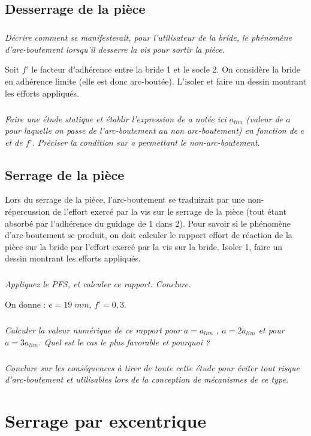\documentclass[10pt]{article}
\begin{document}
\subsection*{Desserrage de la pièce}

\subparagraph{}
\textit{Décrire comment se manifesterait, pour l’utilisateur de la bride, le phénomène d’arc-boutement lorsqu'il desserre la vis pour sortir la pièce.}

Soit $f’$ le facteur d’adhérence entre la bride 1 et le socle 2. On considère la bride en adhérence limite (elle est donc arc-boutée). L’isoler et faire un dessin montrant les efforts appliqués.

\subparagraph{}
\textit{Faire une étude statique et établir l’expression de a notée ici $a_{lim}$ (valeur de $a$ pour laquelle on passe de l'arc-boutement au non arc-boutement) en fonction de $e$ et de $f’$. Préciser la condition sur a permettant le non-arc-boutement.}

\subsection*{Serrage de la pièce}

Lors du serrage de la pièce, l’arc-boutement se traduirait par une non-répercussion de l’effort exercé par la vis sur le serrage de la pièce (tout étant absorbé par l’adhérence du guidage de 1 dans 2). Pour savoir si le phénomène d’arc-boutement se produit, on doit calculer le rapport effort de réaction de la pièce sur la bride par l’effort exercé par la vis sur la bride.  Isoler 1, faire un dessin montrant les efforts appliqués.

\subparagraph{}
\textit{Appliquez le PFS, et calculer ce rapport. Conclure.}

On donne : $e=19 \; mm$, $f’=0,3$. 

\subparagraph{}
\textit{Calculer la valeur numérique de ce rapport pour $a=a_{lim}$ , $a=2a_{lim}$ et pour $a= 3a_{lim}$. Quel est le cas le plus favorable et pourquoi ?}


\subparagraph{}
\textit{Conclure sur les conséquences à tirer de toute cette étude pour éviter tout risque d'arc-boutement et utilisables lors de la conception de mécanismes de ce type.}


\section*{Serrage par excentrique}
\setcounter{subparagraph}{0}
\end{document}
